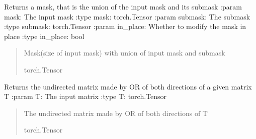 \documentclass[letterpaper,10pt,english]{sphinxmanual}
\begin{document}

\begin{fulllineitems}
\label{\detokenize{nodes:nodes.tensorOps.sub_union}}
\pysigstartsignatures
\pysiglinewithargsret
{}
{\sphinxparamcomma {}\sphinxparamcomma {}}
{}
\pysigstopsignatures
\sphinxAtStartPar
Returns a mask, that is the union of the input mask and its submask
:param mask: The input mask
:type mask: torch.Tensor
:param submask: The submask
:type submask: torch.Tensor
:param in\_place: Whether to modify the mask in place
:type in\_place: bool
\begin{quote}\begin{description}
\sphinxAtStartPar
Mask(size of input mask) with union of input mask and submask

\sphinxAtStartPar
torch.Tensor

\end{description}\end{quote}

\end{fulllineitems}


\begin{fulllineitems}
\label{\detokenize{nodes:nodes.tensorOps.undirected}}
\pysigstartsignatures
\pysiglinewithargsret
{}
{}
{}
\pysigstopsignatures
\sphinxAtStartPar
Returns the undirected matrix made by OR of both directions of a given matrix T
:param T: The input matrix
:type T: torch.Tensor
\begin{quote}\begin{description}
\sphinxAtStartPar
The undirected matrix made by OR of both directions of T

\sphinxAtStartPar
torch.Tensor

\end{description}\end{quote}

\end{fulllineitems}
\end{document}
